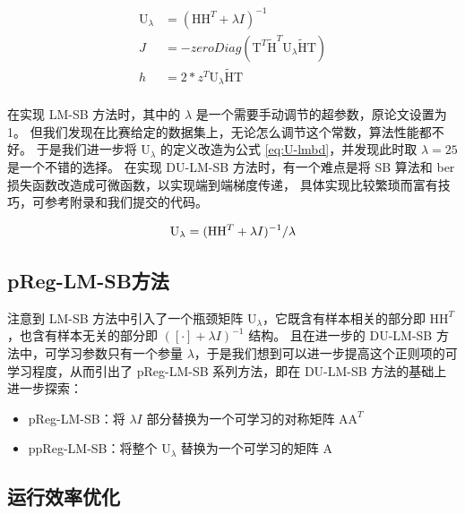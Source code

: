 \documentclass[withoutpreface,bwprint]{cumcmthesis}
\begin{document}
\begin{equation}
\begin{split}
\mathrm U_\lambda &= (\mathrm H \mathrm H^T + \lambda I)^{-1} \\
J &= -zeroDiag(\mathrm T^T \tilde{\mathrm H}^T \mathrm U_\lambda \tilde{\mathrm H} \mathrm T) \\
h &= 2 * z^T \mathrm U_\lambda \tilde{\mathrm H} \mathrm T \\
\end{split}
\label{eq:to-ising-du}
\end{equation}

在实现 LM-SB 方法时，其中的 $ \lambda $ 是一个需要手动调节的超参数，原论文设置为 1。
但我们发现在比赛给定的数据集上，无论怎么调节这个常数，算法性能都不好。
于是我们进一步将 $ \mathrm U_\lambda $ 的定义改造为公式 \ref{eq:U-lmbd}，并发现此时取 $ \lambda = 25 $ 是一个不错的选择。
在实现 DU-LM-SB 方法时，有一个难点是将 SB 算法和 ber 损失函数改造成可微函数，以实现端到端梯度传递，
具体实现比较繁琐而富有技巧，可参考附录和我们提交的代码。

\begin{equation}
\mathrm U_\lambda = (\mathrm H \mathrm H^T + \lambda I)^{-1} / \lambda \\
\label{eq:U-lmbd}
\end{equation}

\subsection{pReg-LM-SB方法}

注意到 LM-SB 方法中引入了一个瓶颈矩阵 $ \mathrm U_\lambda $，它既含有样本相关的部分即 $ \mathrm H \mathrm H^T $，也含有样本无关的部分即 $ ([\cdot] + \lambda I)^{-1} $ 结构。
且在进一步的 DU-LM-SB 方法中，可学习参数只有一个参量 $ \lambda $，于是我们想到可以进一步提高这个正则项的可学习程度，从而引出了 pReg-LM-SB 系列方法，即在 DU-LM-SB 方法的基础上进一步探索：

\begin{itemize}
\item pReg-LM-SB：将 $  \lambda I $ 部分替换为一个可学习的对称矩阵 $ \mathrm{A} \mathrm{A}^T $
\item ppReg-LM-SB：将整个 $ \mathrm U_\lambda $ 替换为一个可学习的矩阵 $ \mathrm{A} $
\end{itemize}

\subsection{运行效率优化}
\end{document}
